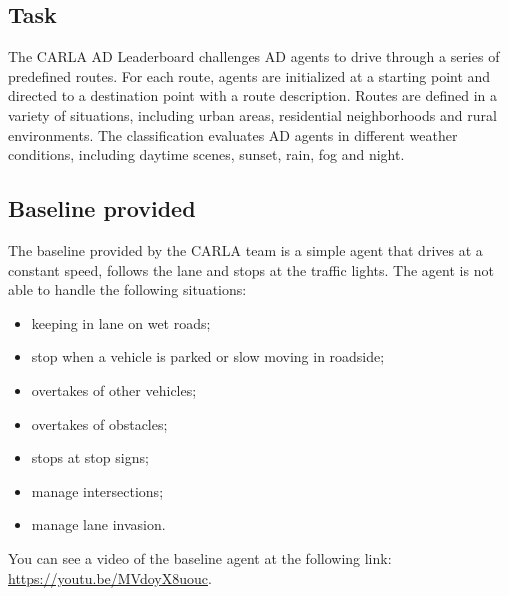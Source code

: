\documentclass{article}
\begin{document}
\subsection{Task}
The CARLA AD Leaderboard challenges AD agents to drive through a series of predefined routes. For each route,
agents are initialized at a starting point and directed to a destination point with a route description.
Routes are defined in a variety of situations, including urban areas, residential neighborhoods and rural environments.
The classification evaluates AD agents in different weather conditions, including daytime scenes, sunset, rain, fog and night.

\subsection{Baseline provided}
The baseline provided by the CARLA team is a simple agent that drives at a constant speed, follows the lane and stops at the traffic lights.
The agent is not able to handle the following situations:
\begin{itemize}
    \item keeping in lane on wet roads;
    \item stop when a vehicle is parked or slow moving in roadside;
    \item overtakes of other vehicles;
    \item overtakes of obstacles;
    \item stops at stop signs;
    \item manage intersections;
    \item manage lane invasion.
\end{itemize}

You can see a video of the baseline agent at the following link: \url{https://youtu.be/MVdoyX8uouc}.
\end{document}
